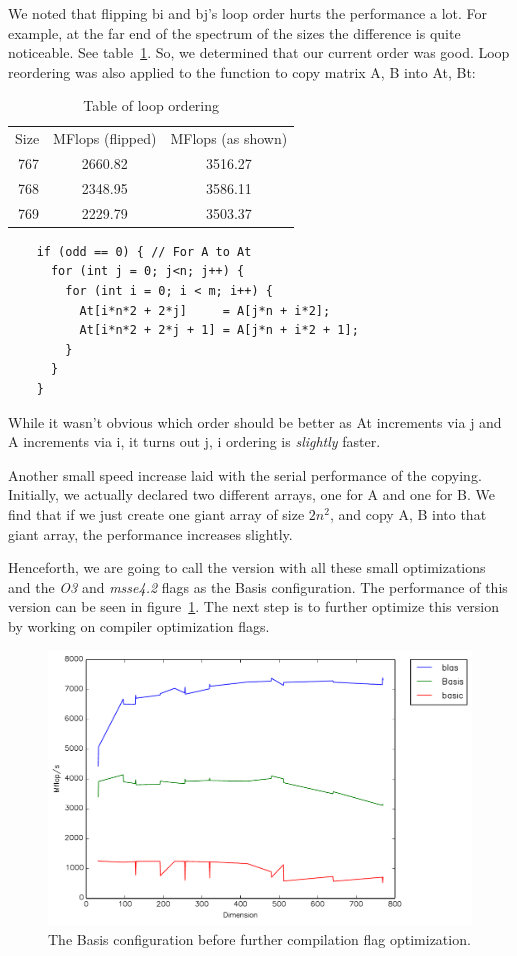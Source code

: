 \documentclass{article}
\begin{document}
    We noted that flipping bi and bj's loop order hurts the performance a lot. For example, at the far end of the spectrum of the sizes the difference is quite noticeable. See table~\ref{tab:looporder}. So, we determined that our current order was good. Loop reordering was also applied to the function to copy matrix A, B into At, Bt:

    \begin{table}
      \centering
      \begin{tabular}{r c c}
        Size & MFlops (flipped) & MFlops (as shown) \\
        767  & 2660.82 & 3516.27\\
        768  & 2348.95 & 3586.11\\
        769  & 2229.79 & 3503.37
      \end{tabular}
      \caption{Table of loop ordering}
      \label{tab:looporder}
    \end{table}

    
    \begin{lstlisting}
    if (odd == 0) { // For A to At
      for (int j = 0; j<n; j++) {
        for (int i = 0; i < m; i++) {
          At[i*n*2 + 2*j]     = A[j*n + i*2];
          At[i*n*2 + 2*j + 1] = A[j*n + i*2 + 1];
        }
      }
    }
    \end{lstlisting}

    While it wasn't obvious which order should be better as At increments via j and A increments via i, it turns out j, i ordering is \emph{slightly} faster.

    Another small speed increase laid with the serial performance of the copying. Initially, we actually declared two different arrays, one for A and one for B.
    We find that if we just create one giant array of size $2n^2$, and copy A, B into that giant array, the performance increases slightly.

    Henceforth, we are going to call the version with all these small optimizations and the \textit{O3} and \textit{msse4.2} flags as the Basis configuration. The performance of this version can be seen in figure~\ref{fig:basis}. The next step is to further optimize this version by working on compiler optimization flags. 

    \begin{figure}[h]
      \centering
      \includegraphics[width=.7\textwidth]{Basis.pdf}
      \caption{The Basis configuration before further compilation flag optimization.}
      \label{fig:basis}
    \end{figure}
\end{document}
